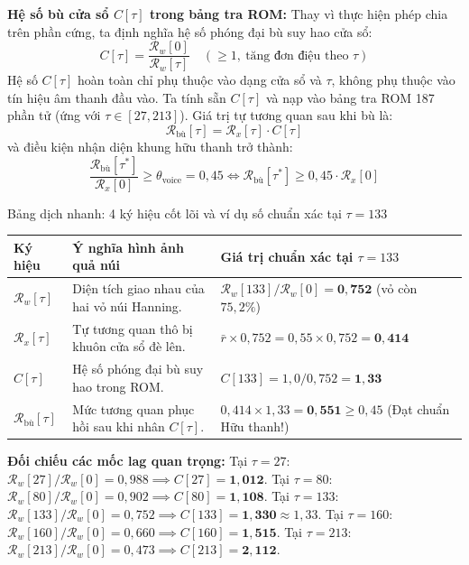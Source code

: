 \documentclass[11pt,a4paper]{article}
\begin{document}
\textbf{Hệ số bù cửa sổ $C[\tau]$ trong bảng tra ROM:}
Thay vì thực hiện phép chia trên phần cứng, ta định nghĩa hệ số phóng đại bù suy hao cửa sổ:
\begin{equation}
C[\tau] = \frac{\mathcal{R}_w[0]}{\mathcal{R}_w[\tau]} \quad (\ge 1,\ \text{tăng đơn điệu theo } \tau)
\label{eq:c_tau_def}
\end{equation}
Hệ số $C[\tau]$ hoàn toàn chỉ phụ thuộc vào dạng cửa sổ và $\tau$, không phụ thuộc vào tín hiệu âm thanh đầu vào. Ta tính sẵn $C[\tau]$ và nạp vào bảng tra ROM 187 phần tử (ứng với $\tau \in [27, 213]$). Giá trị tự tương quan sau khi bù là:
\begin{equation}
\mathcal{R}_{\text{bù}}[\tau] = \mathcal{R}_x[\tau] \cdot C[\tau]
\end{equation}
và điều kiện nhận diện khung hữu thanh trở thành:
\begin{equation}
\frac{\mathcal{R}_{\text{bù}}[\tau^*]}{\mathcal{R}_x[0]} \ge \theta_{\text{voice}} = 0{,}45 \iff \mathcal{R}_{\text{bù}}[\tau^*] \ge 0{,}45 \cdot \mathcal{R}_x[0]
\end{equation}

\begin{thoughtqa}{Bảng dịch nhanh: 4 ký hiệu cốt lõi và ví dụ số chuẩn xác tại $\tau = 133$}
\begin{center}
\begin{tabular}{@{}lll@{}}
\toprule
Ký hiệu & Ý nghĩa hình ảnh quả núi & Giá trị chuẩn xác tại $\tau = 133$ \\ \midrule
$\mathcal{R}_w[\tau]$ & Diện tích giao nhau của hai vỏ núi Hanning. & $\mathcal{R}_w[133] / \mathcal{R}_w[0] = \mathbf{0{,}752}$ (vỏ còn $75{,}2\%$) \\
$\mathcal{R}_x[\tau]$ & Tự tương quan thô bị khuôn cửa sổ đè lên. & $\bar{r} \times 0{,}752 = 0{,}55 \times 0{,}752 = \mathbf{0{,}414}$ \\
$C[\tau]$ & Hệ số phóng đại bù suy hao trong ROM. & $C[133] = 1{,}0 / 0{,}752 = \mathbf{1{,}33}$ \\
$\mathcal{R}_{\text{bù}}[\tau]$ & Mức tương quan phục hồi sau khi nhân $C[\tau]$. & $0{,}414 \times 1{,}33 = \mathbf{0{,}551} \ge 0{,}45$ (Đạt chuẩn Hữu thanh!) \\ \bottomrule
\end{tabular}
\end{center}
\textbf{Đối chiếu các mốc lag quan trọng:}
Tại $\tau = 27$: $\mathcal{R}_w[27]/\mathcal{R}_w[0] = 0{,}988 \implies C[27] = \mathbf{1{,}012}$.
Tại $\tau = 80$: $\mathcal{R}_w[80]/\mathcal{R}_w[0] = 0{,}902 \implies C[80] = \mathbf{1{,}108}$.
Tại $\tau = 133$: $\mathcal{R}_w[133]/\mathcal{R}_w[0] = 0{,}752 \implies C[133] = \mathbf{1{,}330} \approx 1{,}33$.
Tại $\tau = 160$: $\mathcal{R}_w[160]/\mathcal{R}_w[0] = 0{,}660 \implies C[160] = \mathbf{1{,}515}$.
Tại $\tau = 213$: $\mathcal{R}_w[213]/\mathcal{R}_w[0] = 0{,}473 \implies C[213] = \mathbf{2{,}112}$.
\end{thoughtqa}
\end{document}
